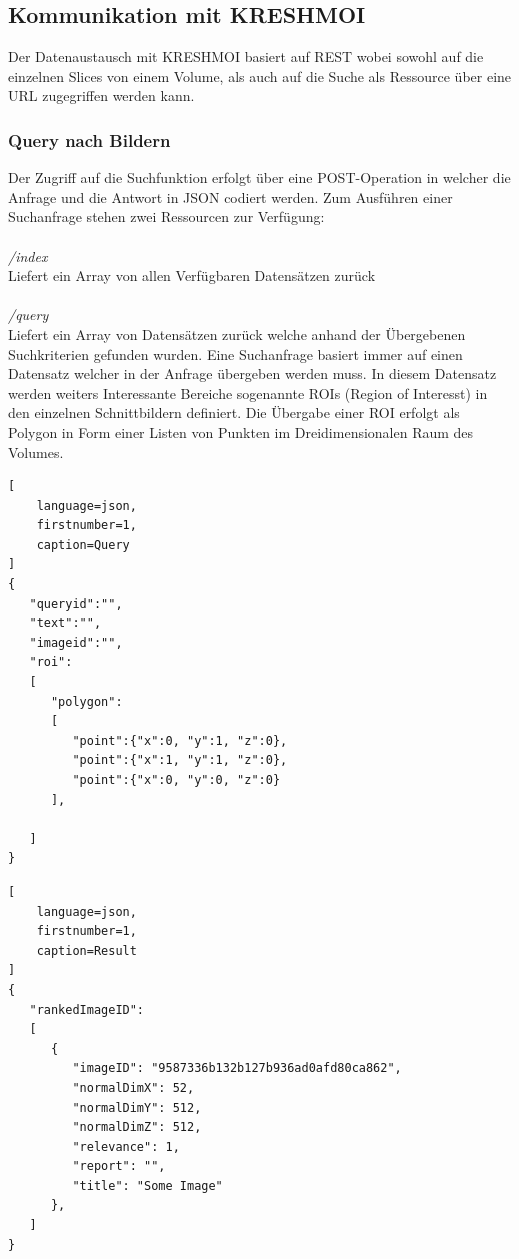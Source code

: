 \subsection{Kommunikation mit KRESHMOI}
\label{sec:Kommunikation mit KRESHMOI}
Der Datenaustausch mit KRESHMOI basiert auf REST wobei sowohl auf die einzelnen Slices von einem Volume, als auch auf die Suche als Ressource über eine URL zugegriffen werden kann.

\subsubsection{Query nach Bildern}
\label{sec:Query nach Bildern}
Der Zugriff auf die Suchfunktion erfolgt über eine POST-Operation in welcher die Anfrage und die Antwort in JSON codiert werden.
Zum Ausführen einer Suchanfrage stehen zwei Ressourcen zur Verfügung:
\\
\\
\textit{/index}\\
Liefert ein Array von allen Verfügbaren Datensätzen zurück 
\\
\\
\textit{/query}\\
Liefert ein Array von Datensätzen zurück welche anhand der Übergebenen Suchkriterien gefunden wurden.
Eine Suchanfrage basiert immer auf einen Datensatz welcher in der Anfrage übergeben werden muss.
In diesem Datensatz werden weiters Interessante Bereiche sogenannte ROIs (Region of Interesst) in den einzelnen Schnittbildern definiert.
Die Übergabe einer ROI erfolgt als Polygon in Form einer Listen von Punkten im Dreidimensionalen Raum des Volumes.
\begin{lstlisting}[
	language=json,
	firstnumber=1,
	caption=Query
]
{
   "queryid":"",
   "text":"",
   "imageid":"",
   "roi": 
   [
      "polygon":
      [
         "point":{"x":0, "y":1, "z":0},
         "point":{"x":1, "y":1, "z":0},
         "point":{"x":0, "y":0, "z":0}
      ],

   ]
}
\end{lstlisting}


\begin{lstlisting}[
	language=json,
	firstnumber=1,
	caption=Result
]
{
   "rankedImageID": 
   [
      {
         "imageID": "9587336b132b127b936ad0afd80ca862",
         "normalDimX": 52,
         "normalDimY": 512,
         "normalDimZ": 512,
         "relevance": 1,
         "report": "",
         "title": "Some Image"
      },
   ]
}
\end{lstlisting}

